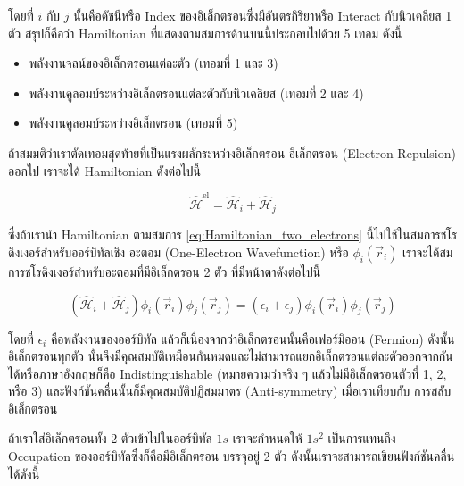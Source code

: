 \noindent โดยที่ $i$ กับ $j$ นั้นคือดัชนีหรือ Index ของอิเล็กตรอนซึ่งมีอันตรกิริยาหรือ Interact กับนิวเคลียส 1 ตัว สรุปก็คือว่า
Hamiltonian ที่แสดงตามสมการด้านบนนี้ประกอบไปด้วย 5 เทอม ดังนี้

\begin{itemize}[topsep=0pt,noitemsep]
    \setlength\itemsep{1em}
    \item พลังงานจลน์ของอิเล็กตรอนแต่ละตัว (เทอมที่ 1 และ 3)

    \item พลังงานคูลอมบ์ระหว่างอิเล็กตรอนแต่ละตัวกับนิวเคลียส (เทอมที่ 2 และ 4)

    \item พลังงานคูลอมบ์ระหว่างอิเล็กตรอน (เทอมที่ 5)
\end{itemize}

ถ้าสมมติว่าเราตัดเทอมสุดท้ายที่เป็นแรงผลักระหว่างอิเล็กตรอน-อิเล็กตรอน (Electron Repulsion) ออกไป เราจะได้ Hamiltonian ดังต่อไปนี้

\begin{equation}
    \label{eq:Hamiltonian_two_electrons}
    \hat{\mathscr{H}}^{\text{el}}
    =
    \hat{\mathscr{H}}_{i} + \hat{\mathscr{H}}_{j}
\end{equation}

\noindent ซึ่งถ้าเรานำ Hamiltonian ตามสมการ \eqref{eq:Hamiltonian_two_electrons} นี้ไปใช้ในสมการชโรดิงเงอร์สำหรับออร์บิทัลเชิง%
อะตอม (One-Electron Wavefunction) หรือ $\phi_{i}(\vec{r}_{i})$ เราจะได้สมการชโรดิงเงอร์สำหรับอะตอมที่มีอิเล็กตรอน 2 ตัว
ที่มีหน้าตาดังต่อไปนี้

\begin{equation}
    \left( \hat{\mathscr{H}}_{i} + \hat{\mathscr{H}}_{j} \right)
    \phi_{i}(\vec{r}_{i})
    \phi_{j}(\vec{r}_{j})
    =
    \left( \epsilon_{i} + \epsilon_{j} \right)
    \phi_{i}(\vec{r}_{i})
    \phi_{j}(\vec{r}_{j})
\end{equation}

\noindent โดยที่ $\epsilon_{i}$ คือพลังงานของออร์บิทัล แล้วก็เนื่องจากว่าอิเล็กตรอนนั้นคือเฟอร์มิออน (Fermion) ดังนั้นอิเล็กตรอนทุกตัว%
นั้นจึงมีคุณสมบัติเหมือนกันหมดและไม่สามารถแยกอิเล็กตรอนแต่ละตัวออกจากกันได้หรือภาษาอังกฤษก็คือ Indistinguishable
(หมายความว่าจริง ๆ แล้วไม่มีอิเล็กตรอนตัวที่ 1, 2, หรือ 3) และฟังก์ชันคลื่นนั้นก็มีคุณสมบัติปฏิสมมาตร (Anti-symmetry) เมื่อเราเทียบกับ%
การสลับอิเล็กตรอน

ถ้าเราใส่อิเล็กตรอนทั้ง 2 ตัวเข้าไปในออร์บิทัล $1s$ เราจะกำหนดให้ $1 s^2$ เป็นการแทนถึง Occupation ของออร์บิทัลซึ่งก็คือมีอิเล็กตรอน%
บรรจุอยู่ 2 ตัว ดังนั้นเราจะสามารถเขียนฟังก์ชันคลื่นได้ดังนี้

